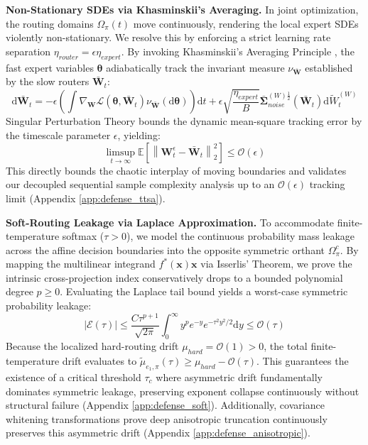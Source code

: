 \documentclass{article}
\newcommand{\E}{\mathbb{E}}
\newcommand{\1}{\mathbb{I}}
\newcommand{\diff}{\mathrm{d}}
\newcommand{\Loss}{\mathcal{L}}
\newcommand{\norm}[1]{\left\lVert#1\right\rVert}
\newcommand{\calO}{\mathcal{O}}
\newcommand{\bx}{\mathbf{x}}
\newcommand{\btheta}{\boldsymbol{\theta}}
\newcommand{\bW}{\mathbf{W}}
\newcommand{\bSigma}{\boldsymbol{\Sigma}}
\begin{document}
\textbf{Non-Stationary SDEs via Khasminskii's Averaging.} In joint optimization, the routing domains $\Omega_\pi(t)$ move continuously, rendering the local expert SDEs violently non-stationary. We resolve this by enforcing a strict learning rate separation $\eta_{router} = \epsilon \eta_{expert}$. By invoking Khasminskii's Averaging Principle \citep{khasminskii1966stochastic}, the fast expert variables $\btheta$ adiabatically track the invariant measure $\nu_{\bar{\bW}}$ established by the slow routers $\bar{\bW}_t$:
\begin{equation}
    \diff \bar{\bW}_t = -\epsilon \left( \int \nabla_{\bW} \Loss(\btheta, \bar{\bW}_t) \nu_{\bar{\bW}}(\diff \btheta) \right) \diff t + \epsilon \sqrt{\frac{\eta_{expert}}{B}} \bar{\bSigma}_{noise}^{(W)\frac{1}{2}}(\bar{\bW}_t) \diff \tilde{W}_t^{(W)}
\end{equation}
Singular Perturbation Theory bounds the dynamic mean-square tracking error by the timescale parameter $\epsilon$, yielding:
\begin{equation} \label{eq: rate bound}
    \limsup_{t \to \infty} \E\left[\norm{\bW_t^\epsilon - \bar{\bW}_t}_2^2\right] \le \calO(\epsilon)
\end{equation}
This directly bounds the chaotic interplay of moving boundaries and validates our decoupled sequential sample complexity analysis up to an $\calO(\epsilon)$ tracking limit (Appendix \ref{app:defense_ttsa}).

\textbf{Soft-Routing Leakage via Laplace Approximation.} To accommodate finite-temperature softmax ($\tau > 0$), we model the continuous probability mass leakage across the affine decision boundaries into the opposite symmetric orthant $\Omega_\pi^c$. By mapping the multilinear integrand $f^*(\bx)\bx$ via Isserlis' Theorem, we prove the intrinsic cross-projection index conservatively drops to a bounded polynomial degree $p \ge 0$. Evaluating the Laplace tail bound yields a worst-case symmetric probability leakage:
\begin{equation}
    |\mathcal{E}(\tau)| \le \frac{C \tau^{p+1}}{\sqrt{2\pi}} \int_{0}^\infty y^p e^{-y} e^{-\tau^2 y^2/2} \diff y \le \calO(\tau)
\end{equation}
 Because the localized hard-routing drift $\mu_{hard} = \calO(1) > 0$, the total finite-temperature drift evaluates to $\tilde{\mu}_{e_1, \pi}(\tau) \ge \mu_{hard} - \calO(\tau)$. This guarantees the existence of a critical threshold $\tau_c$ where asymmetric drift fundamentally dominates symmetric leakage, preserving exponent collapse continuously without structural failure (Appendix \ref{app:defense_soft}). Additionally, covariance whitening transformations prove deep anisotropic truncation continuously preserves this asymmetric drift (Appendix \ref{app:defense_anisotropic}).
\end{document}

